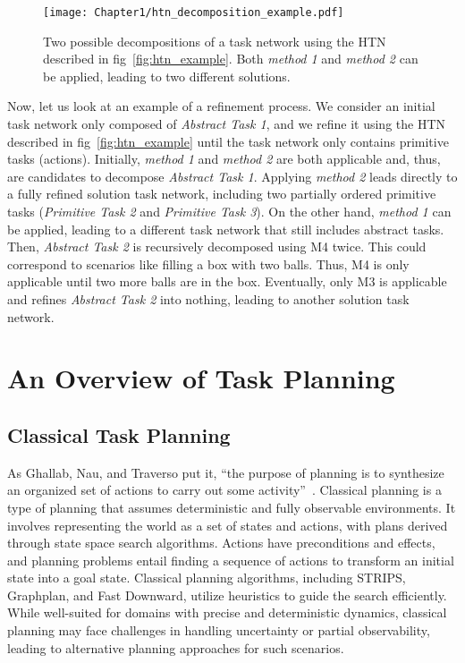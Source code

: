 \begin{figure}
    \center
    \texttt{[image: Chapter1/htn\_decomposition\_example.pdf]}
    \caption{Two possible decompositions of a task network using the HTN described in fig~\ref{fig:htn_example}. Both \emph{method 1} and \emph{method 2} can be applied, leading to two different solutions.
    }
    \label{fig:htn_decomposition_example}
\end{figure}

Now, let us look at an example of a refinement process. We consider an initial task network only composed of \emph{Abstract Task 1}, and we refine it using the HTN described in fig~\ref{fig:htn_example} until the task network only contains primitive tasks (actions). Initially, \emph{method 1} and \emph{method 2} are both applicable and, thus, are candidates to decompose \emph{Abstract Task 1}. Applying \emph{method 2} leads directly to a fully refined solution task network, including two partially ordered primitive tasks (\emph{Primitive Task 2} and \emph{Primitive Task 3}). On the other hand, \emph{method 1} can be applied, leading to a different task network that still includes abstract tasks. Then, \emph{Abstract Task 2} is recursively decomposed using M4 twice. This could correspond to scenarios like filling a box with two balls. Thus, M4 is only applicable until two more balls are in the box. Eventually, only M3 is applicable and refines \emph{Abstract Task 2} into nothing, leading to another solution task network.

\section{An Overview of Task Planning}

\subsection{Classical Task Planning}

As Ghallab, Nau, and Traverso put it, “the purpose of planning is to synthesize an organized set of actions to carry out some activity”~\cite{ghallab2016automated}. 
Classical planning is a type of planning that assumes deterministic and fully observable environments. It involves representing the world as a set of states and actions, with plans derived through state space search algorithms. Actions have preconditions and effects, and planning problems entail finding a sequence of actions to transform an initial state into a goal state. Classical planning algorithms, including STRIPS, Graphplan, and Fast Downward, utilize heuristics to guide the search efficiently. While well-suited for domains with precise and deterministic dynamics, classical planning may face challenges in handling uncertainty or partial observability, leading to alternative planning approaches for such scenarios.

